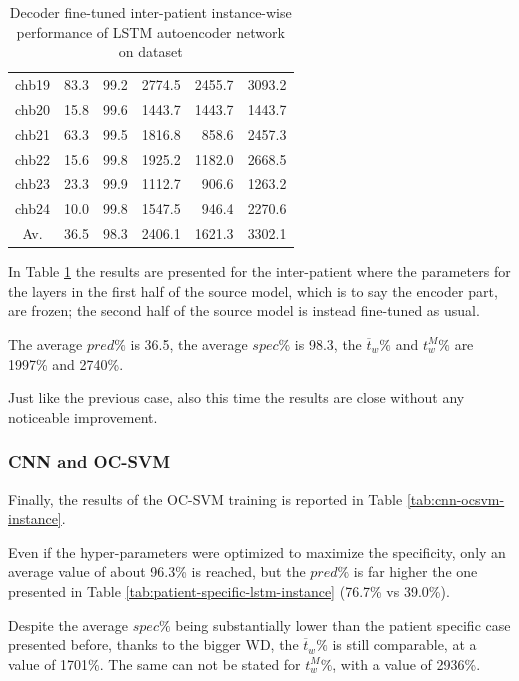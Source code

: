 \begin{table}[ht]
\begin{tabular}{c|rrrrr}
    chb19   & 83.3   & 99.2   & 2774.5  & 2455.7  & 3093.2  \\
    chb20   & 15.8   & 99.6   & 1443.7  & 1443.7  & 1443.7  \\
    chb21   & 63.3   & 99.5   & 1816.8  & 858.6   & 2457.3  \\
    chb22   & 15.6   & 99.8   & 1925.2  & 1182.0  & 2668.5  \\
    chb23   & 23.3   & 99.9   & 1112.7  & 906.6   & 1263.2  \\
    chb24   & 10.0   & 99.8   & 1547.5  & 946.4   & 2270.6  \\ \hline
    Av.     & 36.5   & 98.3   & 2406.1  & 1621.3  & 3302.1  \\ \hline
    \end{tabular}
    \caption{Decoder fine-tuned inter-patient instance-wise performance of LSTM autoencoder network on  dataset}
    \label{tab:decoder-inter-patient-lstm-instance} 
\end{table}

In Table \ref{tab:decoder-inter-patient-lstm-instance} the results are presented for the inter-patient where the parameters for the layers in the first half of the source model, which is to say the encoder part, are frozen; the second half of the source model is instead fine-tuned as usual.

The average $pred\%$ is 36.5, the average $spec\%$ is 98.3, the $\overline{t}_w\%$ and $t_w^M\%$ are 1997\% and 2740\%.

Just like the previous case, also this time the results are close without any noticeable improvement.


\subsubsection{CNN and OC-SVM}
Finally, the results of the \gls{OC-SVM} training is reported in Table \ref{tab:cnn-ocsvm-instance}.

Even if the hyper-parameters were optimized to maximize the specificity, only an average value of about 96.3\% is reached, but the $pred\%$ is far higher the one presented in Table \ref{tab:patient-specific-lstm-instance} (76.7\% vs 39.0\%).

Despite the average $spec\%$ being substantially lower than the patient specific case presented before, thanks to the bigger \gls{WD}, the $\overline{t}_w\%$ is still comparable, at a value of 1701\%. The same can not be stated for $t_w^M\%$,  with a value of 2936\%.

